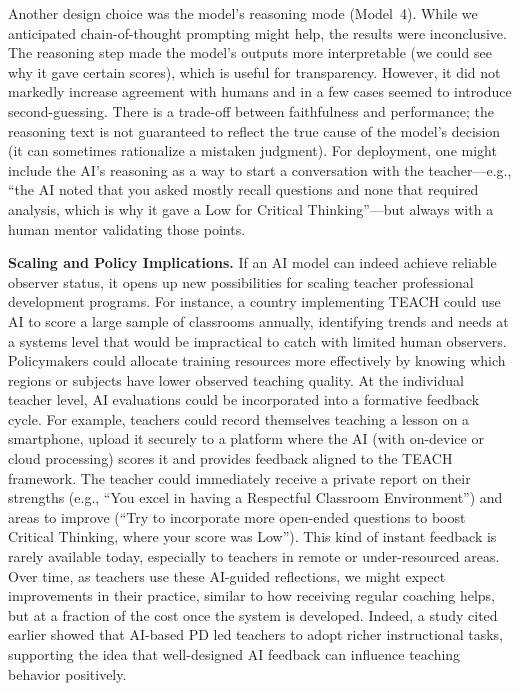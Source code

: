 \documentclass[12pt]{article}
\begin{document}
Another design choice was the model’s reasoning mode (Model~4). While we anticipated chain-of-thought prompting might help, the results were inconclusive. The reasoning step made the model’s outputs more interpretable (we could see why it gave certain scores), which is useful for transparency. However, it did not markedly increase agreement with humans and in a few cases seemed to introduce second-guessing. There is a trade-off between faithfulness and performance; the reasoning text is not guaranteed to reflect the true cause of the model’s decision (it can sometimes rationalize a mistaken judgment). For deployment, one might include the AI’s reasoning as a way to start a conversation with the teacher—e.g., “the AI noted that you asked mostly recall questions and none that required analysis, which is why it gave a Low for Critical Thinking”—but always with a human mentor validating those points.

\textbf{Scaling and Policy Implications.} If an AI model can indeed achieve reliable observer status, it opens up new possibilities for scaling teacher professional development programs. For instance, a country implementing TEACH could use AI to score a large sample of classrooms annually, identifying trends and needs at a systems level that would be impractical to catch with limited human observers. Policymakers could allocate training resources more effectively by knowing which regions or subjects have lower observed teaching quality. At the individual teacher level, AI evaluations could be incorporated into a formative feedback cycle. For example, teachers could record themselves teaching a lesson on a smartphone, upload it securely to a platform where the AI (with on-device or cloud processing) scores it and provides feedback aligned to the TEACH framework. The teacher could immediately receive a private report on their strengths (e.g., “You excel in having a Respectful Classroom Environment”) and areas to improve (“Try to incorporate more open-ended questions to boost Critical Thinking, where your score was Low”). This kind of instant feedback is rarely available today, especially to teachers in remote or under-resourced areas. Over time, as teachers use these AI-guided reflections, we might expect improvements in their practice, similar to how receiving regular coaching helps, but at a fraction of the cost once the system is developed. Indeed, a study cited earlier showed that AI-based PD led teachers to adopt richer instructional tasks, supporting the idea that well-designed AI feedback can influence teaching behavior positively.
\end{document}
